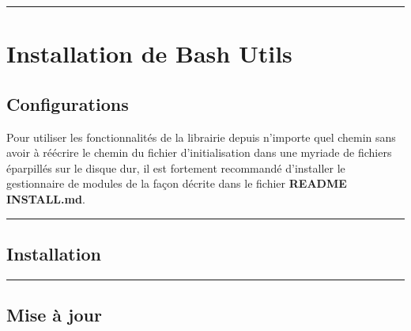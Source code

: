 \documentclass[a4paper,10pt]{article}
\begin{document}



\color{red}\par\noindent\rule{\textwidth}{0.4pt}\color{white}

\color{red}
\section{Installation de Bash Utils}\color{white}

\color{green}
\subsection{Configurations}\color{white}

\begin{justify}
    Pour utiliser les fonctionnalités de la librairie depuis n'importe quel chemin sans avoir à réécrire le chemin du fichier d'initialisation dans une myriade de fichiers éparpillés sur le disque dur, il est fortement recommandé d'installer le gestionnaire de modules de la façon décrite dans le fichier \textbf{\color{lime}README INSTALL.md}.
\end{justify}




\color{green}\par\noindent\rule{\textwidth}{0.4pt}\color{white}

\color{green}
\subsection{Installation}\color{white}

\begin{justify}

\end{justify}




\color{green}\par\noindent\rule{\textwidth}{0.4pt}\color{white}

\color{green}
\subsection{Mise à jour}\color{white}

\begin{justify}

\end{justify}
\end{document}
